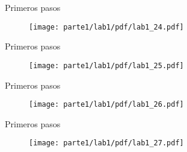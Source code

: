\begin{frame}{Primeros pasos }
\begin{figure}[H]
\centering
\texttt{[image: parte1/lab1/pdf/lab1\_24.pdf]}
\end{figure}
\end{frame}

\begin{frame}{Primeros pasos }
\begin{figure}[H]
\centering
\texttt{[image: parte1/lab1/pdf/lab1\_25.pdf]}
\end{figure}
\end{frame}

\begin{frame}{Primeros pasos }
\begin{figure}[H]
\centering
\texttt{[image: parte1/lab1/pdf/lab1\_26.pdf]}
\end{figure}
\end{frame}

\begin{frame}{Primeros pasos }
\begin{figure}[H]
\centering
\texttt{[image: parte1/lab1/pdf/lab1\_27.pdf]}
\end{figure}
\end{frame}



